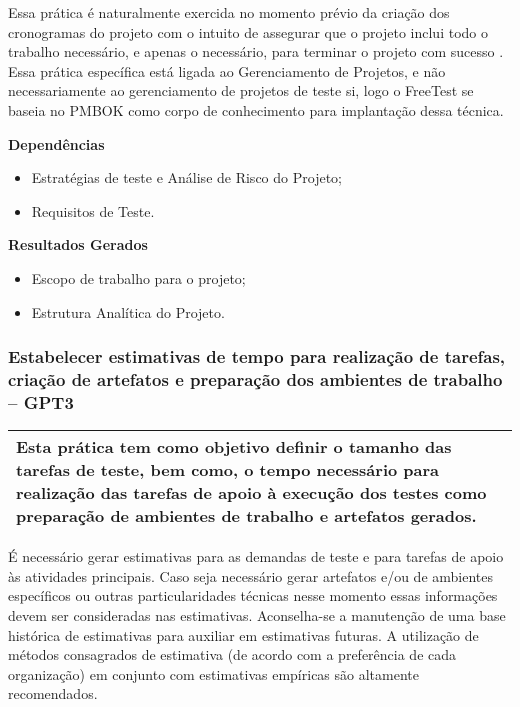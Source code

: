 Essa prática é naturalmente exercida no momento prévio da criação dos cronogramas do projeto com o intuito de assegurar que o projeto inclui todo o trabalho necessário, e apenas o necessário, para terminar o projeto com sucesso \cite{pmbok2014}. Essa prática específica está ligada ao Gerenciamento de Projetos, e não necessariamente ao gerenciamento de projetos de teste si, logo o FreeTest se baseia no PMBOK como corpo de conhecimento para implantação dessa técnica.

\textbf{Dependências}
\begin{itemize}
\item Estratégias de teste e Análise de Risco do Projeto;
\item Requisitos de Teste.
\end{itemize}

\textbf{Resultados Gerados}
\begin{itemize}
\item Escopo de trabalho para o projeto;
\item Estrutura Analítica do Projeto.
\end{itemize}

\subsubsection{Estabelecer estimativas de tempo para realização de tarefas, criação de artefatos e preparação dos ambientes de trabalho – GPT3}
\label{sec:gpt3}

\begin{table}[!ht]
\centering
\begin{tabular}{|p{130mm}|}
\hline
Esta prática tem como objetivo definir o tamanho das tarefas de teste, bem como, o tempo necessário para realização das tarefas de apoio à execução dos testes como preparação de ambientes de trabalho e artefatos gerados. \\ 
\hline
\end{tabular}
\end{table}

É necessário gerar estimativas para as demandas de teste e para tarefas de apoio às atividades principais. Caso seja necessário gerar artefatos e/ou de ambientes específicos ou outras particularidades técnicas nesse momento essas informações devem ser consideradas nas estimativas. Aconselha-se a manutenção de uma base histórica de estimativas para auxiliar em estimativas futuras. A utilização de métodos consagrados de estimativa (de acordo com a preferência de cada organização) em conjunto com estimativas empíricas são altamente recomendados.

